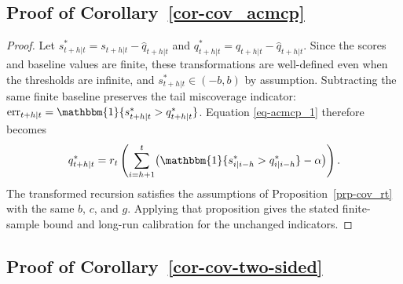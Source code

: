\documentclass[
  american,
  12pt]{article}
\theoremstyle{plain}
\theoremstyle{plain}
\theoremstyle{remark}
\begin{document}
\subsection{\texorpdfstring{Proof of
Corollary~\ref{cor-cov_acmcp}}{Proof of Corollary~}}\label{sec-proof_cov_acmcp}

\begin{proof}
Let \(s_{t+h|t}^{*}=s_{t+h|t}-\hat q_{t+h|t}\) and
\(q_{t+h|t}^{*}=q_{t+h|t}-\hat q_{t+h|t}\). Since the scores and
baseline values are finite, these transformations are well-defined even
when the thresholds are infinite, and \(s_{t+h|t}^{*}\in(-b,b)\) by
assumption. Subtracting the same finite baseline preserves the tail
miscoverage indicator:
\(\mathrm{err}_{t+h|t}=\mathbbm{1}\{s_{t+h|t}^{*}>q_{t+h|t}^{*}\}\).
Equation \eqref{eq-acmcp_1} therefore becomes \[
q_{t+h|t}^{*}=r_t\left(\sum_{i=h+1}^{t}\bigl(\mathbbm{1}\{s_{i|i-h}^{*}>q_{i|i-h}^{*}\}-\alpha\bigr)\right).
\] The transformed recursion satisfies the assumptions of
Proposition~\ref{prp-cov_rt} with the same \(b\), \(c\), and \(g\).
Applying that proposition gives the stated finite-sample bound and
long-run calibration for the unchanged indicators.
\end{proof}

\subsection{\texorpdfstring{Proof of
Corollary~\ref{cor-cov-two-sided}}{Proof of Corollary~}}\label{sec-proof_cov_two_sided}
\end{document}
